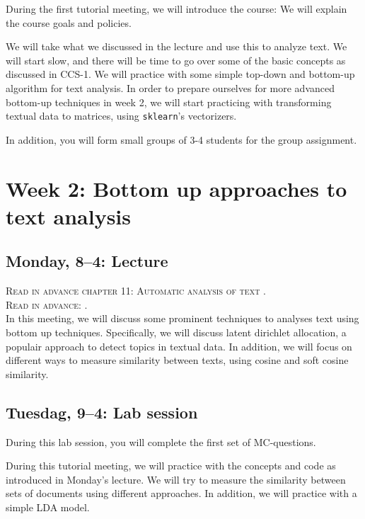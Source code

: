 During the first tutorial meeting, we will introduce the course: We will explain the course goals and policies. 

We will take what we discussed in the lecture and use this to analyze text. We will start slow, and there will be time to go over some of the basic concepts as discussed in CCS-1. We will practice with some simple top-down and bottom-up algorithm for text analysis. In order to prepare ourselves for more advanced bottom-up techniques in week 2, we will start practicing with transforming textual data to matrices, using  \texttt{sklearn}'s vectorizers. 

In addition, you will form small groups of 3-4 students for the group assignment. 

\section*{Week 2:  Bottom up approaches to text analysis}

\subsection*{Monday, 8--4: Lecture}

\textsc{Read in advance chapter 11: Automatic analysis of text \cite{van_atteveldt_computational_2022}.} \\
\textsc{Read in advance: \cite{Brinberg2021}.} \\

In this meeting, we will discuss some prominent techniques to analyses text using bottom up techniques. Specifically, we will discuss latent dirichlet allocation, a populair approach to detect topics in textual data. In addition, we will focus on different ways to measure similarity between texts, using cosine and soft cosine similarity. 

\subsection*{Tuesdag, 9--4: Lab session}
During this lab session, you will complete the first set of MC-questions. 

During this tutorial meeting, we will practice with the concepts and code as introduced in Monday's lecture. We will try to measure the similarity between sets of documents using different approaches. In addition, we will practice with a simple LDA model. \\

